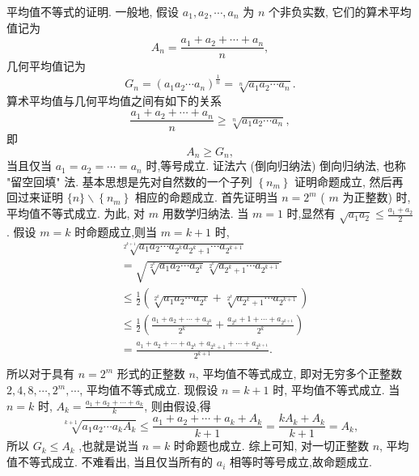 平均值不等式的证明.
一般地, 假设 $a_1, a_2, \cdots, a_n$ 为 $n$ 个非负实数, 它们的算术平均值记为
$$
A_n=\frac{a_1+a_2+\cdots+a_n}{n},
$$
几何平均值记为
$$
G_n=\left(a_1 a_2 \cdots a_n\right)^{\frac{1}{n}}=\sqrt[n]{a_1 a_2 \cdots a_n} .
$$
算术平均值与几何平均值之间有如下的关系
$$
\frac{a_1+a_2+\cdots+a_n}{n} \geqslant \sqrt[n]{a_1 a_2 \cdots a_n},
$$
即
$$
A_n \geqslant G_n,
$$
当且仅当 $a_1=a_2=\cdots=a_n$ 时,等号成立.
证法六 (倒向归纳法)
倒向归纳法, 也称 "留空回填" 法.
基本思想是先对自然数的一个子列 $\left\{n_m\right\}$ 证明命题成立, 然后再回过来证明 $\{n\} \backslash\left\{n_m\right\}$ 相应的命题成立.
首先证明当 $n=2^m$ ( $m$ 为正整数) 时, 平均值不等式成立.
为此, 对 $m$ 用数学归纳法.
当 $m=1$ 时,显然有 $\sqrt{a_1 a_2} \leqslant \frac{a_1+a_2}{2}$.
假设 $m=k$ 时命题成立,则当 $m=k+1$ 时,
$$
\begin{aligned}
& \sqrt[2^{k+1}]{a_1 a_2 \cdots a_{2^k} a_{2^k+1} \cdots a_{2^{k+1}}} \\
& =\sqrt{\sqrt[2^k]{a_1 a_2 \cdots a_{2^k}} \sqrt[2^k]{a_{2^k+1} \cdots a_{2^{k+1}}}} \\
& \leqslant \frac{1}{2}\left(\sqrt[2^k]{a_1 a_2 \cdots a_{2^k}}+\sqrt[2^k]{a_{2^k+1} \cdots a_{2^{k+1}}}\right) \\
& \leqslant \frac{1}{2}\left(\frac{a_1+a_2+\cdots+a_{2^k}}{2^k}+\frac{a_{2^k}+1+\cdots+a_{2^{k+1}}}{2^k}\right) \\
& =\frac{a_1+a_2+\cdots+a_{2^k}+a_{2^k+1}+\cdots+a_{2^{k+1}}}{2^{k+1}} \text {. } \\
&
\end{aligned}
$$
所以对于具有 $n=2^m$ 形式的正整数 $n$, 平均值不等式成立, 即对无穷多个正整数 $2,4,8, \cdots, 2^m, \cdots$, 平均值不等式成立.
现假设 $n=k+1$ 时, 平均值不等式成立.
当 $n=k$ 时, $A_k= \frac{a_1+a_2+\cdots+a_k}{k}$, 则由假设,得
$$
\sqrt[k+1]{a_1 a_2 \cdots a_k A_k} \leqslant \frac{a_1+a_2+\cdots+a_k+A_k}{k+1}=\frac{k A_k+A_k}{k+1}=A_k,
$$
所以 $G_k \leqslant A_k$ ,也就是说当 $n=k$ 时命题也成立.
综上可知, 对一切正整数 $n$, 平均值不等式成立.
不难看出, 当且仅当所有的 $a_i$ 相等时等号成立,故命题成立.



